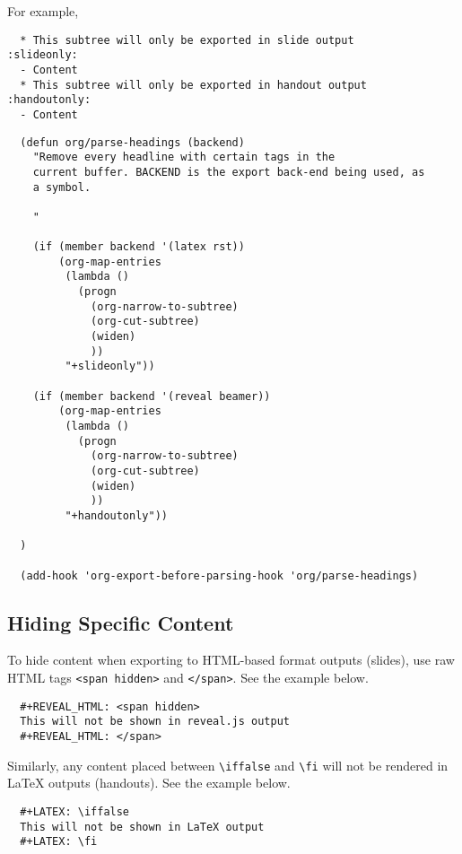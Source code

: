 \documentclass[10pt,article]{article}
\begin{document}
For example,

\begin{verbatim}
  * This subtree will only be exported in slide output      :slideonly:
  - Content
  * This subtree will only be exported in handout output    :handoutonly:
  - Content

\end{verbatim}

{\small
\begin{verbatim}
  (defun org/parse-headings (backend)
    "Remove every headline with certain tags in the
    current buffer. BACKEND is the export back-end being used, as
    a symbol.
  
    "
  
    (if (member backend '(latex rst))
        (org-map-entries
         (lambda ()
           (progn
             (org-narrow-to-subtree)
             (org-cut-subtree)
             (widen)
             ))
         "+slideonly"))
  
    (if (member backend '(reveal beamer))
        (org-map-entries
         (lambda ()
           (progn
             (org-narrow-to-subtree)
             (org-cut-subtree)
             (widen)
             ))
         "+handoutonly"))
  
  )
  
  (add-hook 'org-export-before-parsing-hook 'org/parse-headings)
\end{verbatim}
}
\subsection{Hiding Specific Content}
\label{sec:orge620e9f}
To hide content when exporting to HTML-based format outputs (slides), use raw
HTML tags \texttt{<span hidden>} and \texttt{</span>}. See the example below.

{\small
\begin{verbatim}
  #+REVEAL_HTML: <span hidden>
  This will not be shown in reveal.js output
  #+REVEAL_HTML: </span>
\end{verbatim}
}

Similarly, any content placed between \texttt{\textbackslash{}iffalse} and \texttt{\textbackslash{}fi} will not be
rendered in \LaTeX{} outputs (handouts). See the example below.

{\small
\begin{verbatim}
  #+LATEX: \iffalse
  This will not be shown in LaTeX output
  #+LATEX: \fi
\end{verbatim}
}
\end{document}
